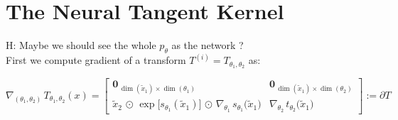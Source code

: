 \documentclass[11pt, a4paper]{article}
\theoremstyle{definition}
\theoremstyle{remark}
\newcommand{\E}{\mathbb{E}}
\newcommand{\empnorm}[1]{\|#1\|_{\mu_n}}
\newcommand{\inner}[2]{\langle #1 , #2 \rangle }
\begin{document}
%	
%	
	

	
	\section{The Neural Tangent Kernel}
	
	 H: Maybe we should see the whole \(p_\theta\) as the network ?\\
	 
	 
	 
	
	First we compute gradient of a transform \(T^{(i)}=T_{\theta_1,\theta_2}\) as:
	
	\[
	\nabla_{(\theta_1,\theta_2)}\,T_{\theta_1,\theta_2}(x)
	=
	\begin{bmatrix}
		\mathbf{0}_{\,\dim(\tilde{x}_1)\times \dim(\theta_1)} 
		& 
		\mathbf{0}_{\,\dim(\tilde{x}_1)\times \dim(\theta_2)} 
		\\[6pt]
		\tilde{x}_2\,\odot\,\exp\bigl[s_{\theta_1}(\tilde{x}_1)\bigr]
		\,\odot\,
		\nabla_{\theta_1}\,s_{\theta_1}\bigl(\tilde{x}_1\bigr)
		&
		\nabla_{\theta_2}\,t_{\theta_2}\bigl(\tilde{x}_1\bigr)
	\end{bmatrix} := \partial T
	\]
	
\end{document}
